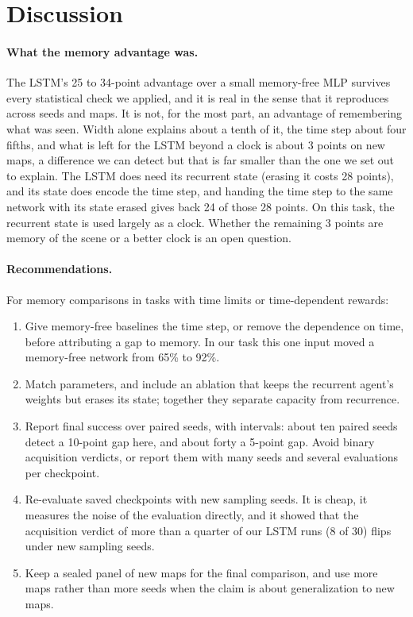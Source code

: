 \section{Discussion}
\label{sec:discussion}

\paragraph{What the memory advantage was.}
The LSTM's 25 to 34-point advantage over a small memory-free MLP survives every statistical check
we applied, and it is real in the sense that it reproduces across seeds and maps. It is not,
for the most part, an advantage of remembering what was seen. Width alone explains about a tenth
of it, the time step about four fifths, and what is left for the LSTM beyond a clock is about
3 points on new maps, a difference we can detect but that is far smaller than the one we set out
to explain. The LSTM does need its recurrent state (erasing it costs 28 points), and its state
does encode the time step, and handing the time step to the same network with its state erased
gives back 24 of those 28 points. On this task, the recurrent state is used largely as a clock. Whether the remaining 3 points are memory of the scene or a
better clock is an open question.

\paragraph{Recommendations.}
For memory comparisons in tasks with time limits or time-dependent rewards:
\begin{enumerate}
  \item Give memory-free baselines the time step, or remove the dependence on time, before
  attributing a gap to memory. In our task this one input moved a memory-free network from 65\%
  to 92\%.
  \item Match parameters, and include an ablation that keeps the recurrent agent's weights but
  erases its state; together they separate capacity from recurrence.
  \item Report final success over paired seeds, with intervals: about ten paired seeds detect a
  10-point gap here, and about forty a 5-point gap. Avoid binary acquisition verdicts, or report
  them with many seeds and several evaluations per checkpoint.
  \item Re-evaluate saved checkpoints with new sampling seeds. It is cheap, it measures the noise
  of the evaluation directly, and it showed that the acquisition verdict of more than a quarter of
our LSTM runs (8 of 30) flips under new sampling seeds.
  \item Keep a sealed panel of new maps for the final comparison, and use more maps rather than
  more seeds when the claim is about generalization to new maps.
\end{enumerate}

